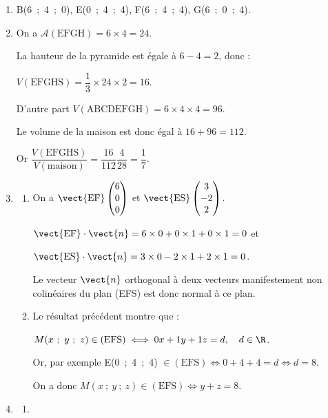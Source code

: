 \begin{enumerate}
\item 
B(6~;~4~;~0), \quad E(0~;~4~;~4), \quad F(6~;~4~;~4), \quad G(6~;~0~;~4).
\item 




On a $\mathcal{A}(\text{EFGH}) = 6 \times 4 = 24$.

La hauteur de la pyramide est égale à $6 - 4 = 2$, donc :

$V(\text{EFGHS}) = \dfrac13 \times 24 \times 2 = 16$.

D'autre part $V(\text{ABCDEFGH})  = 6 \times 4 \times 4 = 96$.

Le volume de la maison est donc égal à $16 + 96 = 112$.

Or $\dfrac{V(\text{EFGHS})}{V(\text{maison})} = \dfrac{16}{112}\dfrac{4}{28} = \dfrac{1}{7}$.
\item 
	\begin{enumerate}
		\item 
		On a $\vect{\text{EF}}\begin{pmatrix}6\\0\\0\end{pmatrix}$ et $\vect{\text{ES}}\begin{pmatrix}3\\-2\\2\end{pmatrix}$.
		
$\vect{\text{EF}}\cdot \vect{n} = 6 \times 0 + 0 \times 1 + 0 \times 1 = 0$ et 

$\vect{\text{ES}}\cdot \vect{n} = 3 \times 0 - 2 \times 1 + 2 \times 1 = 0$.

Le vecteur $\vect{n}$ orthogonal à deux vecteurs manifestement non colinéaires du plan (EFS) est donc normal à ce plan.
		\item 
		Le résultat précédent montre que :
		
$M(x~;~y~;~z) \in (\text{EFS}) \iff 0x + 1y + 1z = d, \quad d \in \R$.

Or, par exemple E(0~;~4~;~4) $\in (\text{EFS}) \iff 0 + 4 + 4 = d \iff d = 8$.

On a donc $M(x~;~y~;~z) \in (\text{EFS}) \iff y + z = 8.$
	\end{enumerate}	
\item 






	\begin{enumerate}
		\item 







\end{enumerate}
\end{enumerate}
